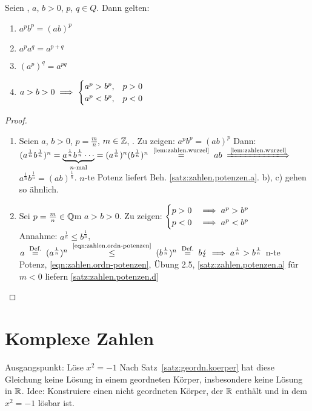 \documentclass[12pt]{scrreprt}
\begin{document}
\begin{satz}\label{satz:zahlen.potenzen}
Seien , $a$, $b > 0$, $p$, $q \in {Q}$. Dann gelten:
\begin{enumerate}
\item \label{satz:zahlen.potenzen.a}
$a^p b^p = (ab)^p$
\item \label{satz:zahlen.potenzen.b}
$a^p a^q = a^{p+q}$
\item \label{satz:zahlen.potenzen.c}
$(a^p)^q = a^{pq}$
\item \label{satz:zahlen.potenzen.d}\vspace{-0.7\baselineskip}
$a>b>0 \implies \begin{cases}
a^p>b^p, &p>0\\
a^p<b^p, &p<0
\end{cases}$
\end{enumerate}
\end{satz}
\begin{proof}
\begin{enumerate}
\item Seien $a$, $b >0$, $p = \frac{m}{n}$, $m \in \mathbb{Z}$, .
Zu zeigen: $a^p b^p = (ab)^p$ Dann: $(a^{\frac{1}{n}}b^{\frac{1}{n}})^n =
\underbrace{a^{\frac{1}{n}}b^{\frac{1}{n}}\dotsm}_{n\text{-mal}} =
(a^{\frac{1}{n}})^n (b^{\frac{1}{n}})^n \nach{=}{\ref{lem:zahlen.wurzel}} ab \folgtnach{\ref{lem:zahlen.wurzel}} $
$a^{\frac{1}{n}}b^{\frac{1}{n}} = (ab)^{\frac{1}{n}}$. $n$-te Potenz liefert Beh. \ref{satz:zahlen.potenzen.a}. b), c) gehen so ähnlich.
\item Sei $p = \frac{m}{n} \in \mathbb{Q}$m $a>b>0$. Zu zeigen: 
$\begin{cases}
p>0 &\implies a^p > b^p\\
p<0 &\implies a^p < b^p
\end{cases}$\\
Annahme: $a^\frac{1}{n} \le b^\frac{1}{n}$, 
$a \nach{=}{Def.} (a^\frac{1}{n})^n \nach{\le}{\ref{eqn:zahlen.ordn-potenzen}} (b^\frac{1}{n})^n \nach{=}{Def.} b 
\blitz \folgt a^\frac{1}{n} > b^\frac{1}{n}$ n-te Potenz, \ref{eqn:zahlen.ordn-potenzen}, Übung 2.5, \ref{satz:zahlen.potenzen.a} 
für $m<0$ liefern \ref{satz:zahlen.potenzen.d}

\end{enumerate}
\end{proof}

\section{Komplexe Zahlen}
\label{sec:zahlen.komplex}
Ausgangspunkt: Löse $x^2 = -1$ Nach Satz~\ref{satz:geordn.koerper} hat diese Gleichung keine Lösung in einem geordneten Körper, insbesondere
keine Lösung in $\mathbb{R}$. Idee: Konstruiere einen nicht geordneten Körper, der $\mathbb{R}$ enthält und in dem $x^2 = -1$ lösbar ist. 
\end{document}
